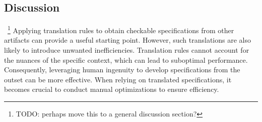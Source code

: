 \subsection{Discussion}~\footnote{\color{red}TODO: perhaps move this to a general
discussion section?} Applying translation rules to obtain checkable
specifications from other artifacts can provide a useful starting point.
However, such translations are also likely to introduce unwanted
inefficiencies. Translation rules cannot account for the nuances of the specific
context, which can lead to suboptimal performance. Consequently, leveraging
human ingenuity to develop specifications from the outset can be more effective.
When relying on translated specifications, it becomes crucial to conduct
manual optimizations to ensure efficiency.
